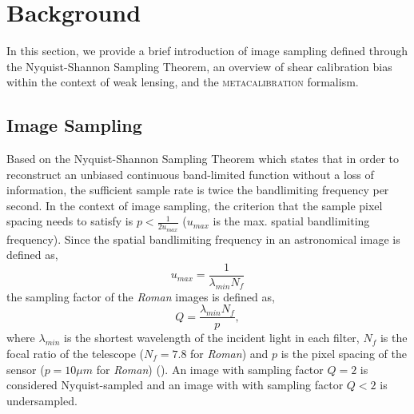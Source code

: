 \documentclass[fleqn,usenatbib]{mnras}
\begin{document}
\section{Background}
\label{sec:background}
In this section, we provide a brief introduction of image sampling defined through the Nyquist-Shannon Sampling Theorem, an overview of shear calibration bias within the context of weak lensing, and the \textsc{metacalibration} formalism.


\subsection{Image Sampling}
Based on the Nyquist-Shannon Sampling Theorem which states that in order to reconstruct an unbiased continuous band-limited function without a loss of information, the sufficient sample rate is twice the bandlimiting frequency per second. In the context of image sampling, the criterion that the sample pixel spacing needs to satisfy is $p < \frac{1}{2u_{max}}$ ($u_{max}$ is the max. spatial bandlimiting frequency). Since the spatial bandlimiting frequency in an astronomical image is defined as, 
\begin{equation}
    u_{max} = \frac{1}{\lambda_{min}N_{f}}
\end{equation}
the sampling factor of the \emph{Roman} images is defined as, 
\begin{equation}
    Q = \frac{\lambda_{min}N_{f}}{p}, 
    \label{eqn:sampling}
\end{equation}
where $\lambda_{min}$ is the shortest wavelength of the incident light in each filter, $N_{f}$ is the focal ratio of the telescope ($N_{f}=7.8$ for \emph{Roman}) and $p$ is the pixel spacing of the sensor ($p=10\mu m$ for \emph{Roman}) (\citealt{2013PASP..125.1496S}). An image with sampling factor $Q=2$ is considered Nyquist-sampled and an image with with sampling factor $Q<2$ is undersampled. 

\end{document}

